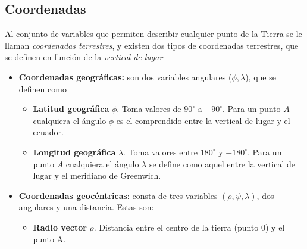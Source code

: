 \subsection{Coordenadas}

Al conjunto de variables que permiten describir cualquier punto de la Tierra se le llaman \textit{coordenadas terrestres}, y existen dos tipos de coordenadas terrestres, que se definen en función de la \textit{vertical de lugar}

\begin{itemize}
	\item \textbf{Coordenadas geográficas:} son dos variables angulares ($\phi,\lambda$), que se definen como

	      \begin{itemize}
		      \item \textbf{Latitud geográfica} $\phi$. Toma valores de $90^\circ$ a $-90^\circ$. Para un punto $A$ cualquiera el ángulo $\phi$ es el comprendido entre la vertical de lugar y el ecuador.
		      \item \textbf{Longitud geográfica} $\lambda$. Toma valores entre $180^\circ$ y $-180^\circ$. Para un punto $A$ cualquiera el ángulo $\lambda$ se define como aquel entre la vertical de lugar y el meridiano de Greenwich.
	      \end{itemize}

	\item \textbf{Coordenadas geocéntricas}: consta de tres variables $(\rho,\psi,\lambda)$, dos angulares y una distancia. Estas son:

	      \vspace{2mm}

	      \begin{minipage}{1\textwidth}
		      \begin{itemize}
			      \item \textbf{Radio vector} $\rho$. Distancia entre el centro de la tierra (punto 0) y el punto A.
		      \end{itemize}
	      \end{minipage}


\end{itemize}
